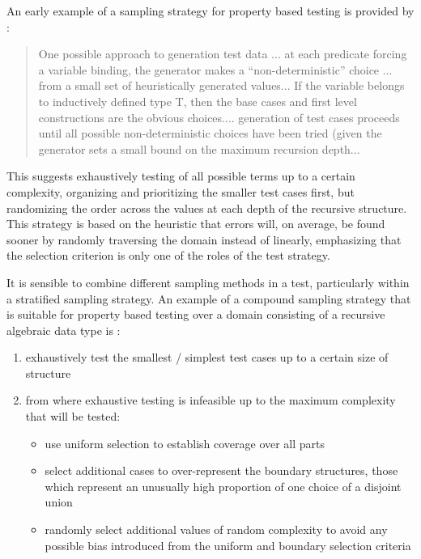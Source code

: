 
An early example of a sampling strategy for property based testing
is provided by \cite{Cartwright1981}:

\begin{quote}
One possible approach to generation test data ... 
at each predicate forcing a variable binding,
the generator makes a ``non-deterministic'' choice ... 
from a small set of heuristically generated values...
If the variable belongs to inductively defined type T, 
then the base cases and first level constructions are the obvious choices.... 
generation of test cases proceeds until all possible non-deterministic choices
have been tried (given the generator sets a small bound on the maximum recursion depth...
\end{quote}

\noindent
This suggests exhaustively testing of all possible terms up to a certain complexity,
organizing and prioritizing the smaller test cases first,
but randomizing the order across the values at each depth of the recursive structure.
This strategy is based on the heuristic that errors will, on average,
be found sooner by randomly traversing the domain instead of linearly,
emphasizing that the selection criterion is only one of the roles of the test strategy.

It is sensible to combine different sampling methods in a test,
particularly within a stratified sampling strategy.
An example of a compound sampling strategy that is suitable for property based testing
over a domain consisting of a recursive algebraic data type is :

    \begin{enumerate}
    \item exhaustively test the smallest / simplest test cases up to a certain size of structure
    \item from where exhaustive testing is infeasible
    up to the maximum complexity that will be tested:
    \begin{itemize}
    \item use uniform selection to establish coverage over all parts
    \item select additional cases to over-represent the boundary structures,
    those which represent an unusually high proportion of one choice of a disjoint union
    \item randomly select additional values of random complexity to
    avoid any possible bias introduced from the uniform and boundary selection criteria
    \end{itemize}
    \end{enumerate}

